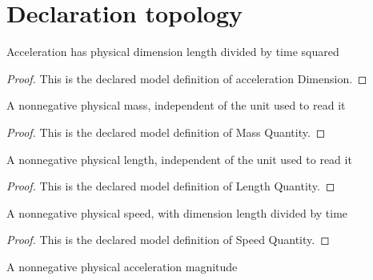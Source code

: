 \section{Declaration topology}
\begin{definition}
  \label{def:physics:phyx-mini-0719:phyxminiproblems-problemphyxmini0719-accelerationdimension}
  Acceleration has physical dimension length divided by time squared
\end{definition}
\begin{proof}
  This is the declared model definition of acceleration Dimension.
\end{proof}
\begin{definition}
  \label{def:physics:phyx-mini-0719:phyxminiproblems-problemphyxmini0719-massquantity}
  A nonnegative physical mass, independent of the unit used to read it
\end{definition}
\begin{proof}
  This is the declared model definition of Mass Quantity.
\end{proof}
\begin{definition}
  \label{def:physics:phyx-mini-0719:phyxminiproblems-problemphyxmini0719-lengthquantity}
  A nonnegative physical length, independent of the unit used to read it
\end{definition}
\begin{proof}
  This is the declared model definition of Length Quantity.
\end{proof}
\begin{definition}
  \label{def:physics:phyx-mini-0719:phyxminiproblems-problemphyxmini0719-speedquantity}
  A nonnegative physical speed, with dimension length divided by time
\end{definition}
\begin{proof}
  This is the declared model definition of Speed Quantity.
\end{proof}
\begin{definition}
  \label{def:physics:phyx-mini-0719:phyxminiproblems-problemphyxmini0719-accelerationquantity}
  A nonnegative physical acceleration magnitude
\end{definition}
